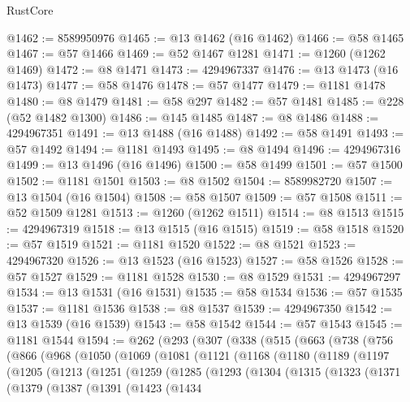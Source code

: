\begin{lexlean}{RustCore}
\begin{coremodule}
@1462 := 8589950976
@1465 := @13 @1462 (@16 @1462)
@1466 := @58 @1465
@1467 := @57 @1466
@1469 := @52 @1467 @1281
@1471 := @1260 (@1262 @1469)
@1472 := @8 @1471
@1473 := 4294967337
@1476 := @13 @1473 (@16 @1473)
@1477 := @58 @1476
@1478 := @57 @1477
@1479 := @1181 @1478
@1480 := @8 @1479
@1481 := @58 @297
@1482 := @57 @1481
@1485 := @228 (@52 @1482 @1300)
@1486 := @145 @1485
@1487 := @8 @1486
@1488 := 4294967351
@1491 := @13 @1488 (@16 @1488)
@1492 := @58 @1491
@1493 := @57 @1492
@1494 := @1181 @1493
@1495 := @8 @1494
@1496 := 4294967316
@1499 := @13 @1496 (@16 @1496)
@1500 := @58 @1499
@1501 := @57 @1500
@1502 := @1181 @1501
@1503 := @8 @1502
@1504 := 8589982720
@1507 := @13 @1504 (@16 @1504)
@1508 := @58 @1507
@1509 := @57 @1508
@1511 := @52 @1509 @1281
@1513 := @1260 (@1262 @1511)
@1514 := @8 @1513
@1515 := 4294967319
@1518 := @13 @1515 (@16 @1515)
@1519 := @58 @1518
@1520 := @57 @1519
@1521 := @1181 @1520
@1522 := @8 @1521
@1523 := 4294967320
@1526 := @13 @1523 (@16 @1523)
@1527 := @58 @1526
@1528 := @57 @1527
@1529 := @1181 @1528
@1530 := @8 @1529
@1531 := 4294967297
@1534 := @13 @1531 (@16 @1531)
@1535 := @58 @1534
@1536 := @57 @1535
@1537 := @1181 @1536
@1538 := @8 @1537
@1539 := 4294967350
@1542 := @13 @1539 (@16 @1539)
@1543 := @58 @1542
@1544 := @57 @1543
@1545 := @1181 @1544
@1594 := @262
    (@293
      (@307
        (@338
          (@515
            (@663
              (@738
                (@756
                  (@866
                    (@968
                      (@1050
                        (@1069
                          (@1081
                            (@1121
                              (@1168
                                (@1180
                                  (@1189
                                    (@1197
                                      (@1205
                                        (@1213
                                          (@1251
                                            (@1259
                                              (@1285
                                                (@1293
                                                  (@1304
                                                    (@1315
                                                      (@1323
                                                        (@1371
                                                          (@1379
                                                            (@1387
                                                              (@1391
                                                                (@1423
                                                                  (@1434

\end{coremodule}
\end{lexlean}
